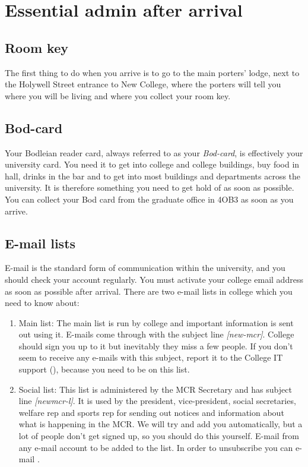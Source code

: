 
\chapter{Essential admin after arrival}

\section{Room key}
The first thing to do when you arrive is to go to the main porters' lodge, next
to the Holywell Street entrance to New College, where the porters will tell you where you will be living and where you collect your room key. 
\section{Bod-card}
Your Bodleian reader card, always referred to as your \emph{Bod-card}, is effectively
your university card. You need it to get into college and college buildings, buy food in hall, drinks in the bar and to get into most buildings and departments across the university. It is therefore something you need to get hold of as soon as possible. You can collect your Bod card from the graduate office in 4OB3 as soon as you arrive.
\section{E-mail lists}
E-mail is the standard form of communication within the university, and you should check your account regularly. You must activate your college email address as soon as possible after arrival. There are two e-mail lists in college which you need to know about:
\begin{enumerate}
  \item Main list: The main list is run by college and important
information is sent out using it. E-mails come through with the subject line
\emph{[new-mcr]}. College should sign you up to it but inevitably they miss a
few people. If you don't seem to receive any e-mails with this subject, report it to the College IT support (\href{mailto:it-support@new.ox.ac.uk}{}), because you need to be on this list.
  \item Social list: This list is administered by the MCR Secretary and has subject line
\emph{[newmcr-l]}. It is used by the president, vice-president, social secretaries, welfare rep and sports rep for
sending out notices and information about what is happening in the MCR. We will
try and add you automatically, but a lot of people don't get signed up, so you
should do this yourself. E-mail
\href{mailto:newmcr-l-subscribe@maillist.ox.ac.uk }{}
from any e-mail account to be added to the list. In order to unsubscribe you can
e-mail
\href{mailto:newmcr-l-unsubscribe@maillist.ox.ac.uk}{}.
\end{enumerate}
